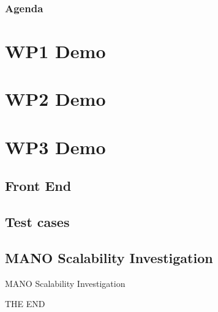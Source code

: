 \documentclass{beamer}
\begin{document}
{
\upbtitlebackground 
\begin{frame}
\titlepage %
\end{frame}
}

\begin{frame}
\frametitle{Agenda} %
\tableofcontents 

\section{WP1 Demo}
\section{WP2 Demo}
\section{WP3 Demo}
\subsection{Front End}
\subsection{Test cases}
\subsection{MANO Scalability Investigation}


\end{frame}













\begin{frame}
\Huge{\centerline{MANO Scalability Investigation}}
\end{frame}



\begin{frame}
\Huge{\centerline{THE END}}
\end{frame}
\end{document}

